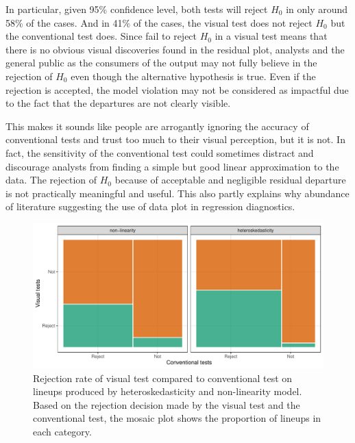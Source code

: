 \documentclass[]{interact}
\theoremstyle{plain}%
\theoremstyle{definition}
\theoremstyle{remark}
\begin{document}
In particular, given 95\% confidence level, both tests will reject
\(H_0\) in only around 58\% of the cases. And in 41\% of the cases, the
visual test does not reject \(H_0\) but the conventional test does.
Since fail to reject \(H_0\) in a visual test means that there is no
obvious visual discoveries found in the residual plot, analysts and the
general public as the consumers of the output may not fully believe in
the rejection of \(H_0\) even though the alternative hypothesis is true.
Even if the rejection is accepted, the model violation may not be
considered as impactful due to the fact that the departures are not
clearly visible.

This makes it sounds like people are arrogantly ignoring the accuracy of
conventional tests and trust too much to their visual perception, but it
is not. In fact, the sensitivity of the conventional test could
sometimes distract and discourage analysts from finding a simple but
good linear approximation to the data. The rejection of \(H_0\) because
of acceptable and negligible residual departure is not practically
meaningful and useful. This also partly explains why abundance of
literature suggesting the use of data plot in regression diagnostics.

\begin{figure}

{\centering \includegraphics[width=1\linewidth]{paper_comparison_files/figure-latex/p-value-comparison-1} 

}

\caption{Rejection rate of visual test compared to conventional test on lineups produced by heteroskedasticity and non-linearity model. Based on the rejection decision made by the visual test and the conventional test, the mosaic plot shows the proportion of lineups in each category.}\label{fig:p-value-comparison}
\end{figure}
\end{document}
